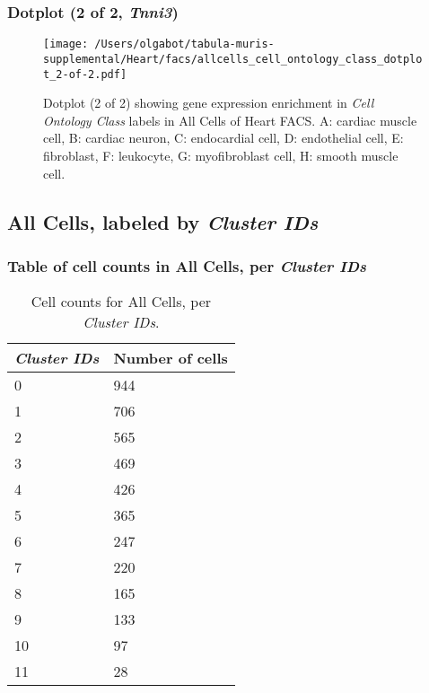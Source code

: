 \clearpage

\subsubsection{Dotplot (2 of 2, \emph{Tnni3})}
\begin{figure}[h]
\centering
\texttt{[image: /Users/olgabot/tabula-muris-supplemental/Heart/facs/allcells\_cell\_ontology\_class\_dotplot\_2-of-2.pdf]}

\caption{ Dotplot (2 of 2)  showing gene expression enrichment in \emph{Cell Ontology Class} labels in All Cells of Heart FACS. A: cardiac muscle cell, B: cardiac neuron, C: endocardial cell, D: endothelial cell, E: fibroblast, F: leukocyte, G: myofibroblast cell, H: smooth muscle cell.}
\end{figure}


\clearpage

\subsection{All Cells, labeled by \emph{Cluster IDs}}
\subsubsection{Table of cell counts in All Cells, per \emph{Cluster IDs}}\begin{table}[h]
\centering
\label{my-label}
\begin{tabular}{@{}ll@{}}
\toprule

\emph{Cluster IDs}& Number of cells \\ \midrule
0 & 944 \\

1 & 706 \\

2 & 565 \\

3 & 469 \\

4 & 426 \\

5 & 365 \\

6 & 247 \\

7 & 220 \\

8 & 165 \\

9 & 133 \\

10 & 97 \\

11 & 28 \\
\bottomrule
\end{tabular}
\caption{Cell counts for All Cells, per \emph{Cluster IDs}.}
\end{table}


